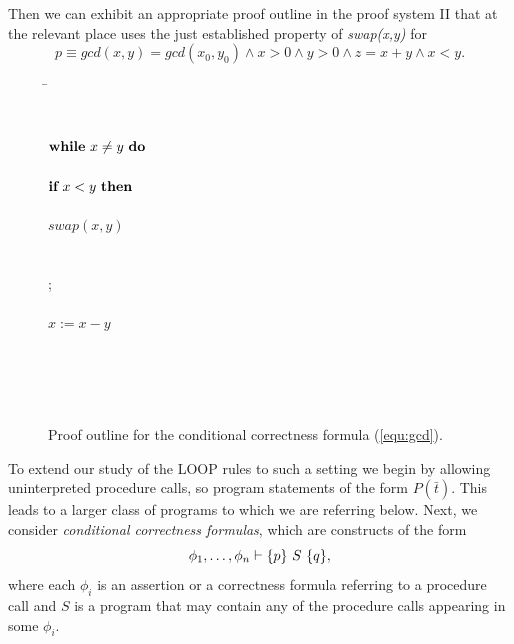 \documentclass[runningheads]{llncs}       %
\begin{document}
Then we can exhibit an appropriate proof outline in the proof
system II that at the relevant place uses the just established property of 
\emph{swap(x,y)} for 
\[
  p \equiv gcd(x,y)=gcd(x_0, y_0)  \wedge x>0 \wedge y>0 \wedge z = x+y \wedge x < y.
\]
 \begin{figure}[ht]
 \begin{tabbing}
 \qquad\qquad                                       
\=  \\
\>  \\
\>      \\
\> $\mbox{$\mbox{{\bf while}\ } {x \neq y}\ \mbox{{\bf do}\ }$}$                          \\
\>  \qquad {} \\
\>  \qquad $\mbox{{\bf if}\ } x < y \mbox{\ {\bf then}\ }$                         \\
\> \qquad \qquad {} \\
\>  \qquad \qquad  $swap(x,y) $                         \\
\> \qquad \qquad {} \\
\> \qquad \qquad {} \\
\>  \qquad \FI; \\
\>  \qquad {} \\
\>  \qquad $x:= x-y$                         \\
\>  \qquad {} \\
\>  \OD                                      \\
\>  \\
\>  \\
\>  
\end{tabbing}
\caption{Proof outline for the conditional correctness formula (\ref{equ:gcd}).}
\label{fig:gcd}

\end{figure}


To extend our study of the LOOP rules to such a setting we
begin by allowing uninterpreted procedure calls, so program statements
of the form $P(\bar{t})$. This leads to a larger class of programs to
which we are referring below. Next, we consider \emph{conditional
  correctness formulas}, which are constructs of the form
\[
\phi_1, \dots, \phi_n \vdash \mbox{$\{{p}\}\ {S}\ \{{q}\}$},
\]
where each $\phi_i$ is an assertion or a correctness formula referring
to a procedure call and $S$ is a program that may contain any of the
procedure calls appearing in some $\phi_i$.
\end{document}

